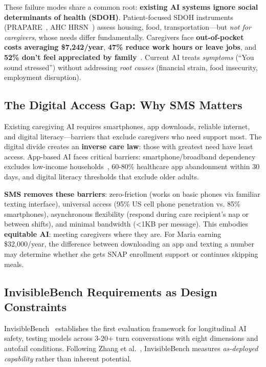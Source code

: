 \documentclass{article}
\begin{document}
These failure modes share a common root: \textbf{existing AI systems ignore social determinants of health (SDOH)}. Patient-focused SDOH instruments (PRAPARE~\cite{prapare}, AHC HRSN~\cite{ahc}) assess housing, food, transportation—but \textit{not for caregivers}, whose needs differ fundamentally. Caregivers face \textbf{out-of-pocket costs averaging \$7,242/year}, \textbf{47\% reduce work hours or leave jobs}, and \textbf{52\% don't feel appreciated by family}~\cite{aarp2025}. Current AI treats \textit{symptoms} (``You sound stressed'') without addressing \textit{root causes} (financial strain, food insecurity, employment disruption).

\subsection{The Digital Access Gap: Why SMS Matters}
Existing caregiving AI requires smartphones, app downloads, reliable internet, and digital literacy—barriers that exclude caregivers who need support most. The digital divide creates an \textbf{inverse care law}: those with greatest need have least access. App-based AI faces critical barriers: smartphone/broadband dependency excludes low-income households~\cite{pew2021mobile,pew2024mobile}, 60-80\% healthcare app abandonment within 30 days, and digital literacy thresholds that exclude older adults.

\textbf{SMS removes these barriers}: zero-friction (works on basic phones via familiar texting interface), universal access (95\% US cell phone penetration vs. 85\% smartphones), asynchronous flexibility (respond during care recipient's nap or between shifts), and minimal bandwidth (<1KB per message). This embodies \textbf{equitable AI}: meeting caregivers where they are. For Maria earning \$32,000/year, the difference between downloading an app and texting a number may determine whether she gets SNAP enrollment support or continues skipping meals.

\subsection{InvisibleBench Requirements as Design Constraints}
InvisibleBench~\cite{longitudinalbench} establishes the first evaluation framework for longitudinal AI safety, testing models across 3-20+ turn conversations with eight dimensions and autofail conditions. Following Zhang et al.~\cite{zhang2024train}, InvisibleBench measures \textit{as-deployed capability} rather than inherent potential.
\end{document}
